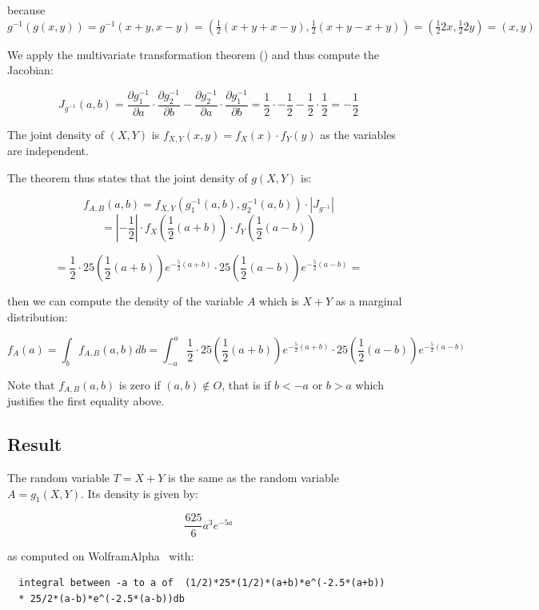 \documentclass{article}
\begin{document}
because $g^{-1} (g(x,y)) = g^{-1}(x+y, x-y) = \left ( \frac{1}{2} (x+y+x-y), \frac{1}{2} ( x+y-x+y) \right ) = \left ( \frac{1}{2} 2x, \frac{1}{2} 2y\right ) = (x,y)$


We apply the multivariate transformation theorem (\cite[2.7]{Hogg-McKean}) and thus compute the Jacobian:

\newcommand{\half}{\frac{1}{2}}

$$J_{g^{-1}}(a,b) =  
   \frac{\partial g^{-1}_1}{\partial a}\cdot\frac{\partial g^{-1}_2}{\partial b}- \frac{\partial g^{-1}_2}{\partial a}\cdot\frac{\partial g^{-1}_1}{\partial b}
    = \half\cdot-\half-\half\cdot\half=-\frac{1}{2}$$

The joint density of $(X,Y)$ is $f_{X,Y}(x,y) = f_X(x)\cdot f_Y(y)$ as the variables are independent.

The theorem thus states that the joint density of $g(X,Y)$ is:

$$ f_{A,B}(a,b) = f_{X,Y}\left( g_1^{-1}(a,b), g_2^{-1}(a,b)\right) \cdot | J_{g^{-1}} | $$
$$ = |-\frac{1}{2}|\cdot f_X(\frac{1}{2}(a+b))\cdot f_Y(\frac{1}{2}(a-b))$$

$$ = \frac{1}{2} \cdot 25(\frac{1}{2}(a+b))e^{-\frac{5}{2}(a+b)} 
           \cdot 25(\frac{1}{2}(a-b))e^{-\frac{5}{2}(a-b)} = $$

then we can compute the density of the variable $A$ which is $X+Y$ as a marginal distribution: 

$$f_A(a) = \int_{b} f_{A,B}(a,b) db = \int _{-a}^{a} \frac{1}{2} \cdot 25(\frac{1}{2}(a+b))e^{-\frac{5}{2}(a+b)} 
           \cdot 25(\frac{1}{2}(a-b))e^{-\frac{5}{2}(a-b)}$$
      
Note that $f_{A,B}(a,b)$ is zero if $(a,b)\notin O$, that is if $b<-a$ or $b>a$ which justifies the first equality above.
      
\subsection{Result}

The random variable $T=X+Y$ is the same as the random variable $A = g_1(X,Y)$. Its density is given by:
           
           $$ \frac{625}{6} a^3 e^{-5 a} $$

as computed on WolframAlpha~\cite{wolfram-alpha} with:

\begin{verbatim}
  integral between -a to a of  (1/2)*25*(1/2)*(a+b)*e^(-2.5*(a+b)) 
  * 25/2*(a-b)*e^(-2.5*(a-b))db
\end{verbatim}
\end{document}
